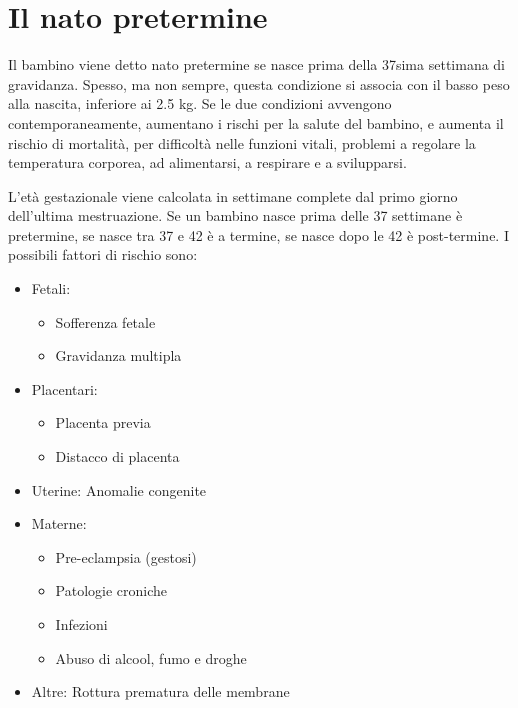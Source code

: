 \chapter{Il nato pretermine}
Il bambino viene detto nato pretermine se nasce prima della 37sima settimana di gravidanza. Spesso, ma non sempre,
questa condizione si associa con il basso peso alla nascita, inferiore ai 2.5 kg. Se le due condizioni avvengono
contemporaneamente, aumentano i rischi per la salute del bambino, e aumenta il rischio di mortalità, per difficoltà
nelle funzioni vitali, problemi a regolare la temperatura corporea, ad alimentarsi, a respirare e a svilupparsi.

L'età gestazionale viene calcolata in settimane complete dal primo giorno dell'ultima mestruazione. Se un bambino
nasce prima delle 37 settimane è pretermine, se nasce tra 37 e 42 è a termine, se nasce dopo le 42 è post-termine.
I possibili fattori di rischio sono:
\begin{itemize}
\item Fetali:
\begin{itemize}
\item Sofferenza fetale
\item Gravidanza multipla
\end{itemize}
\item Placentari:
\begin{itemize}
\item Placenta previa
\item Distacco di placenta
\end{itemize}
\item Uterine: Anomalie congenite
\item Materne:
\begin{itemize}
\item Pre-eclampsia (gestosi)
\item Patologie croniche
\item Infezioni
\item Abuso di alcool, fumo e droghe
\end{itemize}
\item Altre: Rottura prematura delle membrane
\end{itemize}

